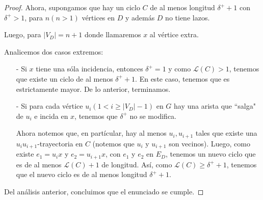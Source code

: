 \documentclass{article}
\begin{document}
\begin{enumerate}
\begin{proof}
      Ahora, supongamos que hay un ciclo $C$ de al menos longitud $\delta^+ +1$
      con $\delta^+ > 1$, para $n(n > 1)$ vértices en $D$ y además $D$ no
      tiene lazos.
      
      Luego, para $|V_D| = n +1$ donde llamaremos $x$ al vértice
      extra.
      
      Analicemos dos casos extremos:

      \begin{itemize}
        \item[-] Si $x$ tiene una sóla incidencia, entonces $\delta^+ = 1$ y como
          $\mathcal{L}(C) > 1$, tenemos que existe un ciclo de al menos $\delta^+ +1$.
          En este caso, tenemos que es estrictamente mayor. 
          De lo anterior, terminamos. 

        \item[-] Si para cada vértice $u_i(1 < i \geq |V_D| -1)$ en $G$ hay
          una arista que ``salga" de $u_i$ e incida en $x$, tenemos que $\delta^+$
          no se modifica.
          
          Ahora notemos que, en partícular, hay al menos
          $u_i, u_{i +1}$ tales que existe una $u_i u_{i +1}$-trayectoria en $C$
          (notemos que $u_i$ y $u_{i +1}$ son vecinos). 
          Luego, como existe $e_1 = u_i x$ y $e_{2} = u_{i +1} x$, con $e_1$
          y $e_2$ en $E_D$, tenemos un nuevo ciclo que es de al menos
          $\mathcal{L}(C) +1$ de longitud. 
          Así, como $\mathcal{L}(C) \geq \delta^+ +1$, tenemos que el nuevo ciclo es
          de al menos longitud $\delta^+ +1$.
      \end{itemize}
      Del análisis anterior, concluimos que el enunciado se cumple.
    \end{proof}
  \end{enumerate}
\end{document}
